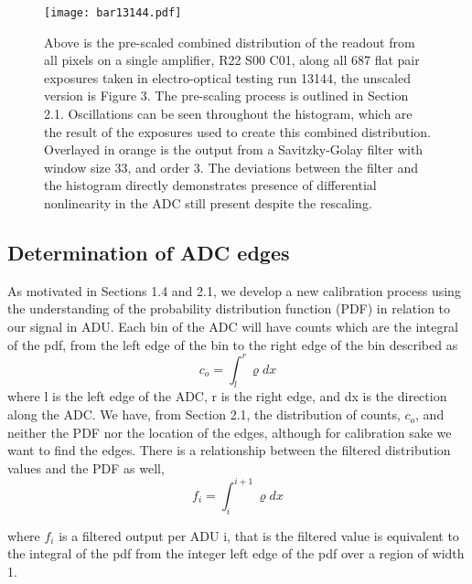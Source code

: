 \documentclass[11pt, letterpaper]{article}
\begin{document}
\begin{figure}
	\texttt{[image: bar13144.pdf]}
	\caption{Above is the pre-scaled combined distribution of the readout from all pixels on a single amplifier, R22 S00 C01, along all 687 flat pair exposures taken in electro-optical testing run 13144, the unscaled version is Figure 3. The pre-scaling process is outlined in Section 2.1. Oscillations can be seen throughout the histogram, which are the result of the exposures used to create this combined distribution. Overlayed in orange is the output from a Savitzky-Golay filter with window size 33, and order 3. The deviations between the filter and the histogram directly demonstrates presence of differential nonlinearity in the ADC still present despite the rescaling.}
\end{figure}

\subsection{Determination of ADC edges} 	
\indent

As motivated in Sections 1.4 and 2.1, we develop a new calibration process using the understanding of the probability distribution function (PDF) in relation to our signal in ADU. 
Each bin of the ADC will have counts which are the integral of the pdf, from the left edge of the bin to the right edge of the bin described as
 \begin{equation}\label{}
c_o =  \int_{l}^{r} \varrho dx
\end{equation}
where l is the left edge of the ADC, r is the right edge, and dx is the direction along the ADC. 
We have, from Section 2.1, the distribution of counts, $c_{o}$, and neither the PDF nor the location of the edges, although for calibration sake we want to find the edges. 
There is a relationship between the filtered distribution values and the PDF as well,
 \begin{equation}\label{}
f_i =  \int_{i}^{i+1} \varrho dx
\end{equation}

where $f_{i}$ is a filtered output per ADU i, that is the filtered value is equivalent to the integral of the pdf from the integer left edge of the pdf over a region of width 1. 
\indent 
\end{document}
